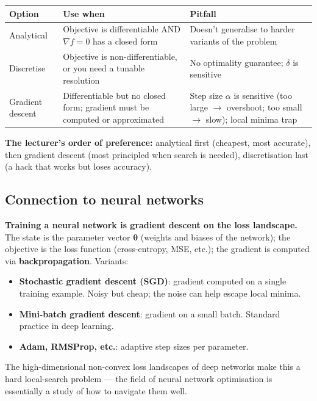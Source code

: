 \documentclass[11pt, a4paper]{article}
\newcommand{\thead}[1]{\textbf{#1}}
\begin{document}
\begin{center}
\renewcommand{\arraystretch}{1.25}
\begin{tabular}{@{}p{3.5cm}p{4.5cm}p{6cm}@{}}
\toprule
\thead{Option} & \thead{Use when} & \thead{Pitfall} \\
\midrule
Analytical    & Objective is differentiable AND $\nabla f = 0$ has a closed form & Doesn't generalise to harder variants of the problem \\
Discretise    & Objective is non-differentiable, or you need a tunable resolution & No optimality guarantee; $\delta$ is sensitive \\
Gradient descent & Differentiable but no closed form; gradient must be computed or approximated & Step size $\alpha$ is sensitive (too large $\to$ overshoot; too small $\to$ slow); local minima trap \\
\bottomrule
\end{tabular}
\end{center}

\textbf{The lecturer's order of preference:} analytical first (cheapest, most accurate), then gradient descent (most principled when search is needed), discretisation last (a hack that works but loses accuracy).

\subsection{Connection to neural networks}

\textbf{Training a neural network is gradient descent on the loss landscape.} The state is the parameter vector $\boldsymbol{\theta}$ (weights and biases of the network); the objective is the loss function (cross-entropy, MSE, etc.); the gradient is computed via \textbf{backpropagation}. Variants:

\begin{itemize}
  \item \textbf{Stochastic gradient descent (SGD)}: gradient computed on a single training example. Noisy but cheap; the noise can help escape local minima.
  \item \textbf{Mini-batch gradient descent}: gradient on a small batch. Standard practice in deep learning.
  \item \textbf{Adam, RMSProp, etc.}: adaptive step sizes per parameter.
\end{itemize}

The high-dimensional non-convex loss landscapes of deep networks make this a hard local-search problem — the field of neural network optimisation is essentially a study of how to navigate them well.
\end{document}
